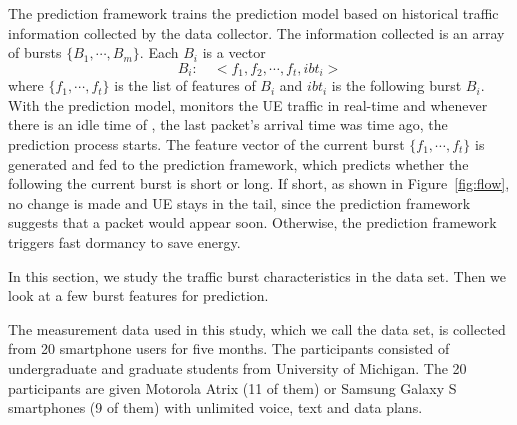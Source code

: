 The \IBT prediction framework trains the prediction model based on historical traffic information collected by the data collector. The information collected is an array of bursts $\{B_{1}, \cdots, B_{m}\}$. Each $B_{i}$ is a vector
\begin{displaymath}
B_{i}:\quad <f_{1}, f_{2}, \cdots, f_{t}, ibt_{i}>
\end{displaymath}
where $\{f_{1}, \cdots, f_{t}\}$ is the list of features of $B_{i}$ and $ibt_{i}$ is the \IBT following burst $B_{i}$.
With the prediction model,  \NAME monitors the UE traffic in real-time and whenever there is an idle time of \BT, \ie the last packet's arrival time was \BT time ago, the prediction process starts. The feature vector of the current burst $\{f_{1}, \cdots, f_{t}\}$ is generated and fed to the prediction framework, which predicts whether the \IBT following the current burst is short or long. If short, as shown in Figure~\ref{fig:flow}, no change is made and UE stays in the tail, since the prediction framework suggests that a packet would appear soon. Otherwise, the prediction framework triggers fast dormancy to save energy.


\label{sec:stats}

In this section, we study the traffic burst characteristics in the \UMICH data set. Then we look at a few burst features for \IBT prediction.

\label{sec:data}
The measurement data used in this study, which we call the \UMICH data set, is collected from 20 smartphone users for five months. The participants consisted of undergraduate and graduate students from University of Michigan. The 20 participants are given Motorola Atrix (11 of them) or Samsung Galaxy S smartphones (9 of them) with unlimited voice, text and data plans.

